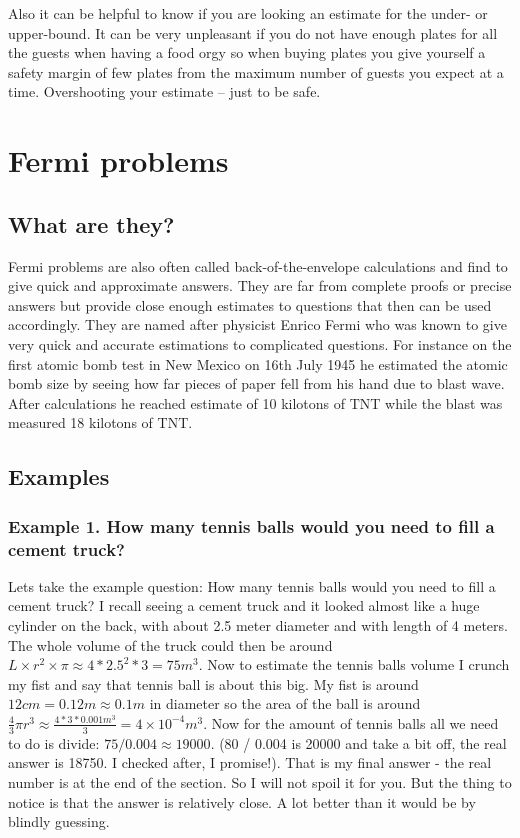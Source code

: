 \documentclass[pdftex, 12pt, a4paper]{report}
\begin{document}
	Also it can be helpful to know if you are looking an estimate for the under- or upper-bound. It can be very unpleasant if you do not have enough plates for all the guests when having a food orgy so when buying plates you give yourself a safety margin of few plates from the maximum number of guests you expect at a time. Overshooting your estimate -- just to be safe.
	
	\section{Fermi problems}
	\subsection{What are they?}
	Fermi problems are also often called back-of-the-envelope calculations and find to give quick and approximate answers. They are far from complete proofs or precise answers but provide close enough estimates to questions that then can be used accordingly. They are named after physicist Enrico Fermi who was known to give very quick and accurate estimations to complicated questions. For instance on the first atomic bomb test in New Mexico on 16th July 1945 he estimated the atomic bomb size by seeing how far pieces of paper fell from his hand due to blast wave. After calculations he reached estimate of 10 kilotons of TNT while the blast was measured 18 kilotons of TNT.
	\subsection{Examples}
	
	\subsubsection{Example 1. How many tennis balls would you need to fill a cement truck?}
	
	Lets take the example question: How many tennis balls would you need to fill a cement truck? I recall seeing a cement truck and it looked almost like a huge cylinder on the back, with about 2.5 meter diameter and with length of 4 meters. The whole volume of the truck could then be around $L \times r^2 \times \pi \approx 4 * 2.5^2 * 3 = 75 m^3$. Now to estimate the tennis balls volume I crunch my fist and say that tennis ball is about this big. My fist is around $12cm = 0.12m \approx 0.1m$ in diameter so the area of the ball is around $\frac{4}{3}\pi r^3 \approx \frac{4*3*0.001m^3}{3} = 4\times10^{-4}m^3$. Now for the amount of tennis balls all we need to do is divide: $75 / 0.004 \approx 19000$. (80 / 0.004 is 20000 and take a bit off, the real answer is 18750. I checked after, I promise!). That is my final answer - the real number is at the end of the section. So I will not spoil it for you. But the thing to notice is that the answer is relatively close. A lot better than it would be by blindly guessing.\newline
	
\end{document}
